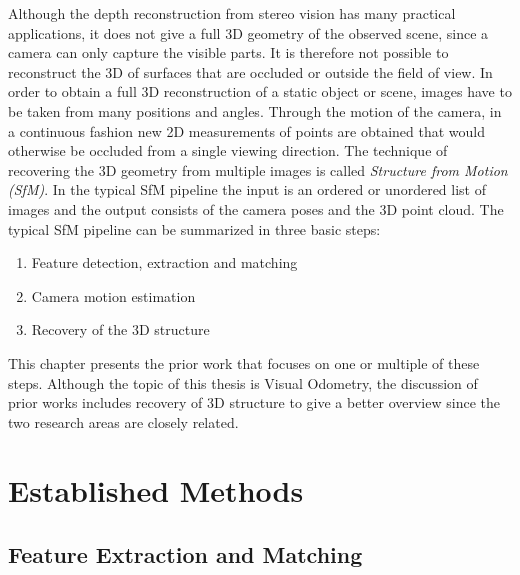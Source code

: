 	Although the depth reconstruction from stereo vision has many practical applications, it does not give a full 3D geometry of the observed scene, since a camera can only capture the visible parts.
	It is therefore not possible to reconstruct the 3D of surfaces that are occluded or outside the field of view. 
	In order to obtain a full 3D reconstruction of a static object or scene, images have to be taken from many positions and angles.
	Through the motion of the camera, in a continuous fashion new 2D measurements of points are obtained that would otherwise be occluded from a single viewing direction.
	The technique of recovering the 3D geometry from multiple images is called \emph{Structure from Motion (SfM)}.
	In the typical SfM pipeline the input is an ordered or unordered list of images and the output consists of the camera poses and the 3D point cloud.
	The typical SfM pipeline can be summarized in three basic steps:
	\begin{enumerate}
		\item Feature detection, extraction and matching
		\item Camera motion estimation
		\item Recovery of the 3D structure
	\end{enumerate}
	This chapter presents the prior work that focuses on one or multiple of these steps.
	Although the topic of this thesis is Visual Odometry, the discussion of prior works includes recovery of 3D structure to give a better overview since the two research areas are closely related. 
	
	\section{Established Methods}
	
		\subsection{Feature Extraction and Matching}

